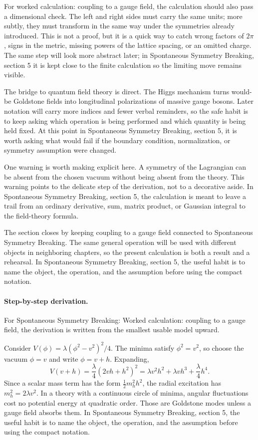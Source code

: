 For worked calculation: coupling to a gauge field, the calculation should also pass a dimensional check.  The left and right sides must carry the same units; more subtly, they must transform in the same way under the symmetries already introduced.  This is not a proof, but it is a quick way to catch wrong factors of \(2\pi\), signs in the metric, missing powers of the lattice spacing, or an omitted charge.  The same step will look more abstract later; in Spontaneous Symmetry Breaking, section 5 it is kept close to the finite calculation so the limiting move remains visible.

The bridge to quantum field theory is direct.  The Higgs mechanism turns would-be Goldstone fields into longitudinal polarizations of massive gauge bosons.  Later notation will carry more indices and fewer verbal reminders, so the safe habit is to keep asking which operation is being performed and which quantity is being held fixed.  At this point in Spontaneous Symmetry Breaking, section 5, it is worth asking what would fail if the boundary condition, normalization, or symmetry assumption were changed.

One warning is worth making explicit here.  A symmetry of the Lagrangian can be absent from the chosen vacuum without being absent from the theory.  This warning points to the delicate step of the derivation, not to a decorative aside.  In Spontaneous Symmetry Breaking, section 5, the calculation is meant to leave a trail from an ordinary derivative, sum, matrix product, or Gaussian integral to the field-theory formula.

The section closes by keeping coupling to a gauge field connected to Spontaneous Symmetry Breaking.  The same general operation will be used with different objects in neighboring chapters, so the present calculation is both a result and a rehearsal.  In Spontaneous Symmetry Breaking, section 5, the useful habit is to name the object, the operation, and the assumption before using the compact notation.



\paragraph{Step-by-step derivation.}

For Spontaneous Symmetry Breaking: Worked calculation: coupling to a gauge field, the derivation is written from the smallest usable model upward.

Consider \(V(\phi)=\lambda(\phi^2-v^2)^2/4\).  The minima satisfy \(\phi^2=v^2\), so choose the vacuum \(\phi=v\) and write \(\phi=v+h\).  Expanding,
\[
  V(v+h)=\frac{\lambda}{4}(2vh+h^2)^2
  =\lambda v^2h^2+\lambda vh^3+\frac{\lambda}{4}h^4.
\]
Since a scalar mass term has the form \(\frac12m_h^2h^2\), the radial excitation has \(m_h^2=2\lambda v^2\).  In a theory with a continuous circle of minima, angular fluctuations cost no potential energy at quadratic order.  Those are Goldstone modes unless a gauge field absorbs them.  In Spontaneous Symmetry Breaking, section 5, the useful habit is to name the object, the operation, and the assumption before using the compact notation.

